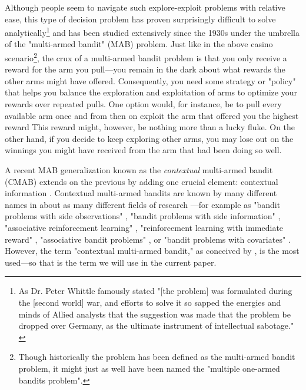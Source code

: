 \documentclass{jss}
\begin{document}
Although people seem to navigate such explore-exploit problems with relative ease, this type of decision problem has proven surprisingly difficult to solve analytically\footnote{As Dr. Peter Whittle famously stated "[the problem] was formulated during the [second world] war, and efforts to solve it so sapped the energies and minds of Allied analysts that the suggestion was made that the problem be dropped over Germany, as the ultimate instrument of intellectual sabotage." \citep{Whittle1979}} and has been studied extensively since the 1930s \citep{Bubeck2012} under the umbrella of the "multi-armed bandit" (MAB) problem. Just like in the above casino scenario\footnote{Though historically the problem has been defined as the multi-armed bandit problem, it might just as well have been named the "multiple one-armed bandits problem".}, the crux of a multi-armed bandit problem is that you only receive a reward for the arm you pull---you remain in the dark about what rewards the other arms might have offered. Consequently, you need some strategy or "policy" that helps you balance the exploration and exploitation of arms to optimize your rewards over repeated pulls. One option would, for instance, be to pull every available arm once and from then on exploit the arm that offered you the highest reward This reward might, however, be nothing more than a lucky fluke. On the other hand, if you decide to keep exploring other arms, you may lose out on the winnings you might have received from the arm that had been doing so well.

A recent MAB generalization known as the \textit{contextual} multi-armed bandit (CMAB) extends on the previous by adding one crucial element: contextual information \citep{Langford2008}. Contextual multi-armed bandits are known by many different names in about as many different fields of research \citep{Tewari2017}---for example as "bandit problems with side observations" \citep{Wang2005a}, "bandit problems with side information" \citep{Lu2010}, "associative reinforcement learning" \citep{Kaelbling1996}, "reinforcement learning with immediate reward" \citep{Abe2003}, "associative bandit problems" \citep{Strehl2006}, or "bandit problems with covariates" \citep{Sarkar1991}. However, the term "contextual multi-armed bandit," as conceived by \cite{Langford2008}, is the most used---so that is the term we will use in the current paper.
\end{document}
